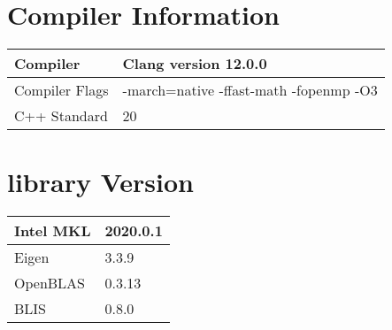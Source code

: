 \section{Compiler Information}
\begin{table}[htb]
    \centering
    \begin{tabular}{|l | l|}
        \hline
        Compiler & Clang version 12.0.0 \\
        \hline
        Compiler Flags & -march=native -ffast-math -fopenmp -O3 \\
        \hline
        C++ Standard & 20 \\
        \hline
    \end{tabular}
\end{table}

\section{library Version}
\begin{table}[htb]
    \centering
    \begin{tabular}{|l | l|}
        \hline
        Intel MKL & 2020.0.1 \\
        \hline
        Eigen & 3.3.9 \\
        \hline
        OpenBLAS & 0.3.13 \\
        \hline
        BLIS & 0.8.0 \\
        \hline
    \end{tabular}
\end{table}